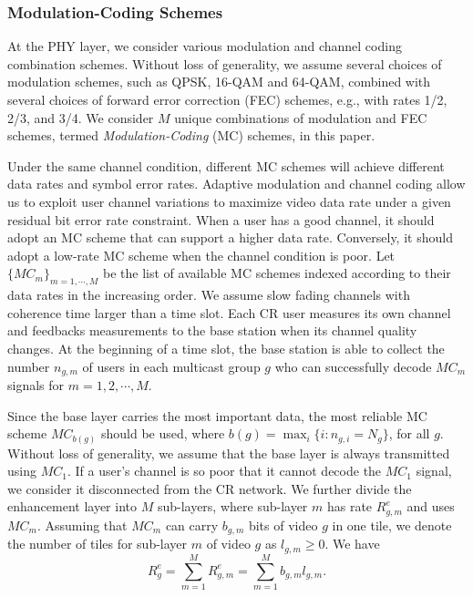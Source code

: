\documentclass[12pt,onecolumn,draftclsnofoot]{IEEEtran} %
\begin{document}
\subsubsection{Modulation-Coding Schemes \label{subsec:mcs}}

At the PHY layer, we consider various modulation and channel coding combination schemes.  Without loss of generality, we assume several choices of modulation schemes, such as QPSK, 16-QAM and 64-QAM, combined with several choices of forward error correction (FEC) schemes, e.g., with rates 1/2, 2/3, and 3/4. We consider $M$ unique combinations of modulation and FEC schemes, termed {\em Modulation-Coding} (MC) schemes, in this paper.

Under the same channel condition, different MC schemes will achieve different data rates and symbol error rates. Adaptive modulation and channel coding allow us to exploit user channel variations to maximize video data rate under a given residual bit error rate constraint. When a user has a good channel, it should adopt an MC scheme that can support a higher data rate. Conversely, it should adopt a low-rate MC scheme when the channel condition is poor.  Let $\{MC_m\}_{m=1,\cdots,M}$ be the list of available MC schemes indexed according to their data rates in the increasing order.  We assume slow fading channels with coherence time larger than a time slot.  Each CR user measures its own channel and feedbacks measurements to the base station when its channel quality changes.  At the beginning of a time slot, the base station is able to collect the number $n_{g,m}$ of users in each multicast group $g$ who can successfully decode $MC_m$ signals for $m=1, 2, \cdots, M$. 

Since the base layer carries the most important data, the most reliable MC scheme $MC_{b(g)}$ should be used, where $b(g) = \max_i \{ i : n_{g,i} = N_g \}$, for all $g$.  Without loss of generality, we assume that the base layer is always transmitted using $MC_1$. If a user's channel is so poor that it cannot decode the $MC_1$ signal, we consider it disconnected from the CR network.  We further divide the enhancement layer into $M$ sub-layers, where sub-layer $m$ has rate $R_{g,m}^e$ and uses $MC_m$.  Assuming that $MC_m$ can carry $b_{g,m}$ bits of video $g$ in one tile, we denote the number of tiles for sub-layer $m$ of video $g$ as $l_{g,m} \geq 0$. We have 
\begin{equation}
R_g^e = \sum_{m=1}^M R_{g,m}^e = \sum_{m=1}^M b_{g,m} l_{g,m}.
\end{equation}
\end{document}
